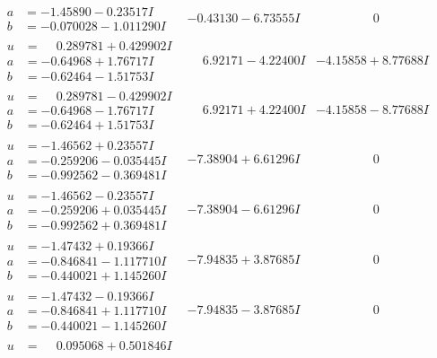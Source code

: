 \documentclass[1p]{elsarticle_modified}
\theoremstyle{definition}
\begin{document}
$$\begin{array}{c|c|c}
\begin{aligned}
a &= -1.45890 - 0.23517 I \\
b &= -0.070028 - 1.011290 I\end{aligned}
 & -0.43130 - 6.73555 I & \phantom{-0.000000 } 0 \\ \hline\begin{aligned}
u &= \phantom{-}0.289781 + 0.429902 I \\
a &= -0.64968 + 1.76717 I \\
b &= -0.62464 - 1.51753 I\end{aligned}
 & \phantom{-}6.92171 - 4.22400 I & -4.15858 + 8.77688 I \\ \hline\begin{aligned}
u &= \phantom{-}0.289781 - 0.429902 I \\
a &= -0.64968 - 1.76717 I \\
b &= -0.62464 + 1.51753 I\end{aligned}
 & \phantom{-}6.92171 + 4.22400 I & -4.15858 - 8.77688 I \\ \hline\begin{aligned}
u &= -1.46562 + 0.23557 I \\
a &= -0.259206 - 0.035445 I \\
b &= -0.992562 - 0.369481 I\end{aligned}
 & -7.38904 + 6.61296 I & \phantom{-0.000000 } 0 \\ \hline\begin{aligned}
u &= -1.46562 - 0.23557 I \\
a &= -0.259206 + 0.035445 I \\
b &= -0.992562 + 0.369481 I\end{aligned}
 & -7.38904 - 6.61296 I & \phantom{-0.000000 } 0 \\ \hline\begin{aligned}
u &= -1.47432 + 0.19366 I \\
a &= -0.846841 - 1.117710 I \\
b &= -0.440021 + 1.145260 I\end{aligned}
 & -7.94835 + 3.87685 I & \phantom{-0.000000 } 0 \\ \hline\begin{aligned}
u &= -1.47432 - 0.19366 I \\
a &= -0.846841 + 1.117710 I \\
b &= -0.440021 - 1.145260 I\end{aligned}
 & -7.94835 - 3.87685 I & \phantom{-0.000000 } 0 \\ \hline\begin{aligned}
u &= \phantom{-}0.095068 + 0.501846 I \\

\end{aligned}
\end{array}$$
\end{document}

